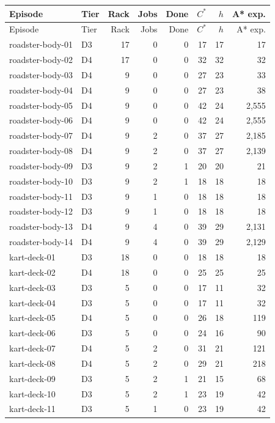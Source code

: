 \begin{longtable}{p{}lrrrrrr}\toprule
Episode & Tier & Rack & Jobs & Done & $C^*$ & $h$ & A* exp.\\\midrule
\endfirsthead
\toprule
Episode & Tier & Rack & Jobs & Done & $C^*$ & $h$ & A* exp.\\\midrule\endhead
\midrule\endfoot
\bottomrule\endlastfoot
roadster-body-01 & D3 & 17 & 0 & 0 & 17 & 17 & 17\\
roadster-body-02 & D4 & 17 & 0 & 0 & 32 & 32 & 32\\
roadster-body-03 & D4 & 9 & 0 & 0 & 27 & 23 & 33\\
roadster-body-04 & D4 & 9 & 0 & 0 & 27 & 23 & 38\\
roadster-body-05 & D4 & 9 & 0 & 0 & 42 & 24 & 2,555\\
roadster-body-06 & D4 & 9 & 0 & 0 & 42 & 24 & 2,555\\
roadster-body-07 & D4 & 9 & 2 & 0 & 37 & 27 & 2,185\\
roadster-body-08 & D4 & 9 & 2 & 0 & 37 & 27 & 2,139\\
roadster-body-09 & D3 & 9 & 2 & 1 & 20 & 20 & 21\\
roadster-body-10 & D3 & 9 & 2 & 1 & 18 & 18 & 18\\
roadster-body-11 & D3 & 9 & 1 & 0 & 18 & 18 & 18\\
roadster-body-12 & D3 & 9 & 1 & 0 & 18 & 18 & 18\\
roadster-body-13 & D4 & 9 & 4 & 0 & 39 & 29 & 2,131\\
roadster-body-14 & D4 & 9 & 4 & 0 & 39 & 29 & 2,129\\
kart-deck-01 & D3 & 18 & 0 & 0 & 18 & 18 & 18\\
kart-deck-02 & D4 & 18 & 0 & 0 & 25 & 25 & 25\\
kart-deck-03 & D3 & 5 & 0 & 0 & 17 & 11 & 32\\
kart-deck-04 & D3 & 5 & 0 & 0 & 17 & 11 & 32\\
kart-deck-05 & D4 & 5 & 0 & 0 & 26 & 18 & 119\\
kart-deck-06 & D3 & 5 & 0 & 0 & 24 & 16 & 90\\
kart-deck-07 & D4 & 5 & 2 & 0 & 31 & 21 & 121\\
kart-deck-08 & D4 & 5 & 2 & 0 & 29 & 21 & 218\\
kart-deck-09 & D3 & 5 & 2 & 1 & 21 & 15 & 68\\
kart-deck-10 & D3 & 5 & 2 & 1 & 23 & 19 & 42\\
kart-deck-11 & D3 & 5 & 1 & 0 & 23 & 19 & 42\\

\end{longtable}
